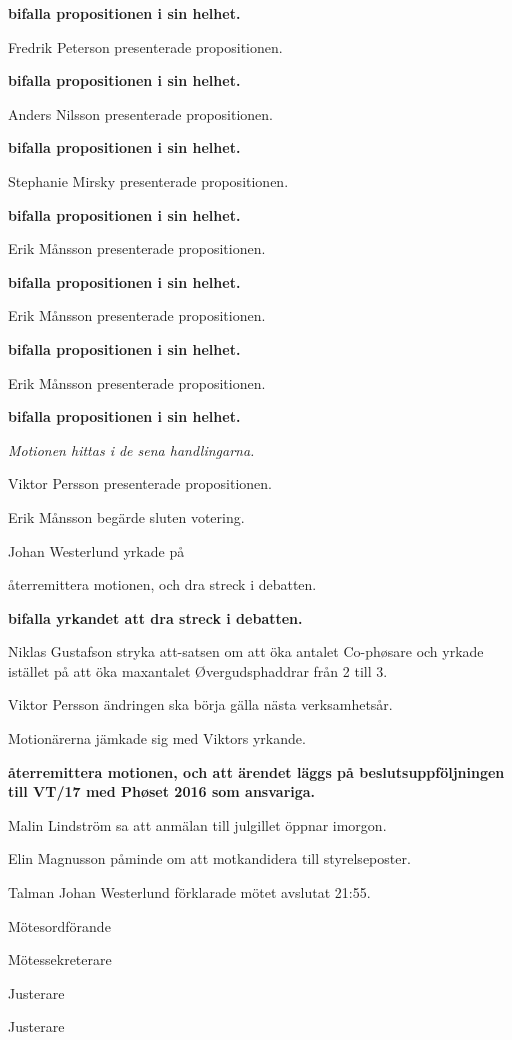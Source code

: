 \documentclass[10pt]{article}
\def\mo{Johan Westerlund}
\def\ms{Erik Månsson}
\def\ji{Elin Magnusson}
\def\jii{Pontus Landgren}
\begin{document}
\begin{paragrafer}
\begin{paragrafer}
        \textbf{\Mba bifalla propositionen i sin helhet.}

        Fredrik Peterson presenterade propositionen.

        \textbf{\Mba bifalla propositionen i sin helhet.}

        Anders Nilsson presenterade propositionen.

        \textbf{\Mba bifalla propositionen i sin helhet.}

        Stephanie Mirsky presenterade propositionen.

        \textbf{\Mba bifalla propositionen i sin helhet.}

        Erik Månsson presenterade propositionen.

        \textbf{\Mba bifalla propositionen i sin helhet.}

        Erik Månsson presenterade propositionen.

        \textbf{\Mba bifalla propositionen i sin helhet.}

        Erik Månsson presenterade propositionen.

        \textbf{\Mba bifalla propositionen i sin helhet.}

    \end{paragrafer}
\emph{Motionen hittas i de sena handlingarna.}

Viktor Persson presenterade propositionen.

Erik Månsson begärde sluten votering.

Johan Westerlund yrkade på
\begin{attsatser}
    \att återremittera motionen, och
    \att dra streck i debatten.
\end{attsatser}

\textbf{\Mba bifalla yrkandet att dra streck i debatten.}

Niklas Gustafson \ypa stryka att-satsen om att öka antalet Co-phøsare och yrkade istället på att öka maxantalet Øvergudsphaddrar från 2 till 3.

Viktor Persson \ypa ändringen ska börja gälla nästa verksamhetsår.

Motionärerna jämkade sig med Viktors yrkande.

\textbf{\Mba återremittera motionen, och att ärendet läggs på beslutsuppföljningen till VT/17 med Phøset 2016 som ansvariga.}

Malin Lindström sa att anmälan till julgillet öppnar imorgon.

Elin Magnusson påminde om att motkandidera till styrelseposter.

Talman {\mo} förklarade mötet avslutat 21:55.

\end{paragrafer}

\hidesignfoot
\begin{signatures}{4}
\signature{\mo}{Mötesordförande}
\signature{\ms}{Mötessekreterare}
\signature{\ji}{Justerare}
\signature{\jii}{Justerare}
\end{signatures}
\end{document}
